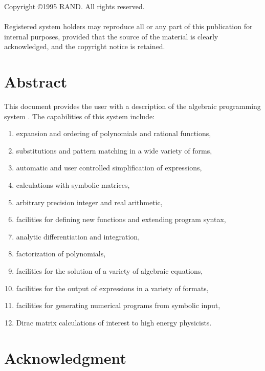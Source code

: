 \newpage
\vspace*{3.0in}
\noindent Copyright \copyright 1995 RAND.  All rights reserved. \\
\mbox{}\\
%
\noindent Registered system holders may reproduce all or any part of this
publication for internal purposes, provided that the source of the
material is clearly acknowledged, and the copyright notice is retained.

\pagestyle{headings}
\setcounter{page}{0}
\tableofcontents

\chapter*{Abstract}


This document provides the user with a description of the algebraic
programming system {\REDUCE}.  The capabilities of this system include:
\begin{enumerate}
\item expansion and ordering of polynomials and rational functions,
\item substitutions and pattern matching in a wide variety of forms,
\item automatic and user controlled simplification of expressions,
\item calculations with symbolic matrices,
\item arbitrary precision integer and real arithmetic,
\item facilities for defining new functions and extending program syntax,
\item analytic differentiation and integration,
\item factorization of polynomials,
\item facilities for the solution of a variety of algebraic equations,
\item facilities for the output of expressions in a variety of formats,
\item facilities for generating numerical programs from symbolic input,
\item Dirac matrix calculations of interest to high energy physicists.
\end{enumerate}

\chapter*{Acknowledgment}

